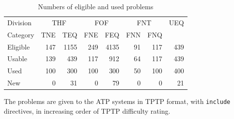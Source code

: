 \documentclass[aic]{iosart2x}
\begin{document}
\begin{table}[tbh]
\caption{Numbers of eligible and used problems}
\label{ProblemNumbers}
\begin{tabular}{l|rr|rr|rr|r}
\hline
\multicolumn{1}{l}{Division} &
\multicolumn{2}{c}{THF} &
\multicolumn{2}{c}{FOF} &
\multicolumn{2}{c}{FNT} &
\multicolumn{1}{c}{UEQ} \\
Category                  & {\tiny TNE} & {\tiny TEQ} 
                                      & {\tiny FNE} & {\tiny FEQ} 
                                                  & {\tiny FNN} & {\tiny FNQ} & \\
\hline
Eligible                  & 147 &1155 & 249 &4135 &  91 & 117 & 439 \\
Usable                    & 139 & 439 & 117 & 912 &  64 & 117 & 439 \\
Used                      & 100 & 300 & 100 & 300 &  50 & 100 & 400 \\
New                       &   0 &  31 &   0 &  79 &   0 &   0 &  21 \\
\hline
\end{tabular}
\end{table}

The problems are given to the ATP systems in TPTP format, with {\tt include} directives,
in increasing order of TPTP difficulty rating.
\end{document}
